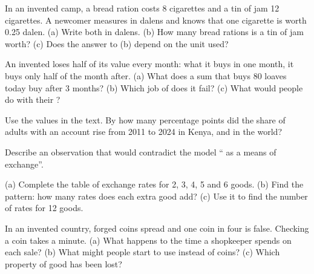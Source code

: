 \begin{exercise}[$\star\star$]\label{exo:g7:money:6}
In an invented camp, a bread ration costs 8 cigarettes and a tin of jam 12 cigarettes. A
newcomer measures  in dalens and knows that one cigarette is worth 0.25 dalen.
(a) Write both  in dalens. (b) How many bread rations is a tin of jam worth? (c) Does
the answer to (b) depend on the unit used?
\end{exercise}

\begin{exercise}[$\star\star$]\label{exo:g7:money:7}
An invented  loses half of its value every month: what it buys in one month, it buys
only half of the month after. (a) What does a sum that buys 80 loaves today buy after 3
months? (b) Which job of  does it fail? (c) What would people do with their ?
\end{exercise}

\begin{exercise}[$\star\star$]\label{exo:g7:money:8}
Use the values in the text. By how many percentage points did the share of adults with an
account rise from 2011 to 2024 in Kenya, and in the world?
\end{exercise}

\begin{exercise}[$\star\star$]\label{exo:g7:money:9}
Describe an observation that would contradict the model `` as a means of exchange''.
\end{exercise}

\begin{exercise}[$\star\star\star$]\label{exo:g7:money:10}
(a) Complete the table of  exchange rates for 2, 3, 4, 5 and 6 goods. (b) Find the
pattern: how many rates does each extra good add? (c) Use it to find the number of rates
for 12 goods.
\end{exercise}

\begin{exercise}[$\star\star\star$]\label{exo:g7:money:11}
In an invented country, forged coins spread and one coin in four is false. Checking a coin
takes a minute. (a) What happens to the time a shopkeeper spends on each sale? (b) What
might people start to use instead of coins? (c) Which property of good  has been
lost?
\end{exercise}

